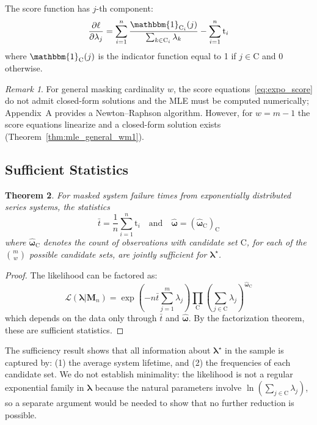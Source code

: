 \documentclass[12pt]{article}
\newcommand{\RV}[1]{\mathrm{#1}}
\newcommand{\cand}{\RV{C}}         %
\newcommand{\ti}{\mathrm{t}}       %
\newcommand{\tparam}[1]{{#1}^{\star}}  %
\newcommand{\likelihood}{\mathcal{L}}
\newcommand{\mfs}{\mathbf{M}_n}
\newcommand{\cntsymb}{\boldsymbol{\hat\omega}}
\renewcommand{\vec}[1]{\boldsymbol{#1}}
\newcommand{\SetIndicator}[1]{\mathbbm{1}_{#1}}
\newtheorem{theorem}{Theorem}[section]
\theoremstyle{definition}
\theoremstyle{remark}
\newtheorem{remark}[theorem]{Remark}
\begin{document}
The score function has $j$-th component:
\begin{equation}
\label{eq:expo_score}
\frac{\partial \ell}{\partial \lambda_j} = \sum_{i=1}^{n} \frac{\SetIndicator{\cand_i}(j)}{\sum_{k \in \cand_i} \lambda_k} - \sum_{i=1}^{n} \ti_i
\end{equation}
where $\SetIndicator{\cand}(j)$ is the indicator function equal to 1 if $j \in \cand$ and 0 otherwise.

\begin{remark}
For general masking cardinality $w$, the score equations~\eqref{eq:expo_score} do not admit closed-form solutions and the MLE must be computed numerically; Appendix~A provides a Newton--Raphson algorithm. However, for $w = m-1$ the score equations linearize and a closed-form solution exists (Theorem~\ref{thm:mle_general_wm1}).
\end{remark}

\subsection{Sufficient Statistics}

\begin{theorem}
\label{thm:sufficient_stats}
For masked system failure times from exponentially distributed series systems, the statistics
\begin{equation}
\bar{t} = \frac{1}{n} \sum_{i=1}^{n} \ti_i \quad \text{and} \quad \cntsymb = (\cntsymb_{\cand})_{\cand}
\end{equation}
where $\cntsymb_{\cand}$ denotes the count of observations with candidate set $\cand$, for each of the $\binom{m}{w}$ possible candidate sets, are jointly sufficient for $\tparam{\vec{\lambda}}$.
\end{theorem}

\begin{proof}
The likelihood can be factored as:
\begin{equation}
\likelihood(\vec{\lambda} | \mfs) = \exp\left(-n \bar{t} \sum_{j=1}^{m} \lambda_j\right) \prod_{\cand} \left(\sum_{j \in \cand} \lambda_j\right)^{\cntsymb_{\cand}}
\end{equation}
which depends on the data only through $\bar{t}$ and $\cntsymb$. By the factorization theorem, these are sufficient statistics.
\end{proof}

The sufficiency result shows that all information about $\tparam{\vec{\lambda}}$ in the sample is captured by: (1) the average system lifetime, and (2) the frequencies of each candidate set.
We do not establish minimality: the likelihood is not a regular exponential family in $\vec{\lambda}$ because the natural parameters involve $\ln(\sum_{j \in \cand} \lambda_j)$, so a separate argument would be needed to show that no further reduction is possible.
\end{document}
